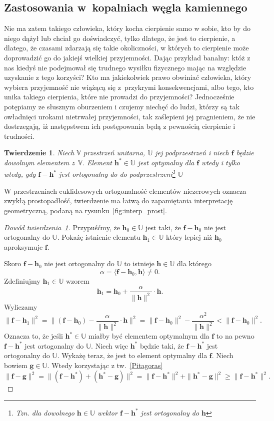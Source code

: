 \documentclass[12pt]{mwbk}
\theoremstyle{plain}
\newtheorem{twier}{Twierdzenie}[chapter] %
\theoremstyle{definition}
\theoremstyle{remark}
\newcommand{\ff}{\mathbf{f}}
\newcommand{\hh}{\mathbf{h}}
\newcommand{\gggg}{\mathbf{g}}
\newcommand{\skalar}[2]{\pmb{\langle}#1,#2\pmb{\rangle}}
\begin{document}
\subsection{Zastosowania w~kopalniach węgla kamiennego}
Nie ma zatem takiego człowieka, który kocha cierpienie samo w sobie, 
kto by do niego dążył lub chciał go doświadczyć, tylko dlatego, że
jest to cierpienie, a dlatego, że czasami zdarzają się takie 
okoliczności, w których to cierpienie może doprowadzić 
go do jakiejś wielkiej przyjemności. 
Dając przykład banalny: któż z nas kiedyś nie podejmował 
się trudnego wysiłku fizycznego mając na względzie 
uzyskanie z tego korzyści? 
Kto ma jakiekolwiek prawo obwiniać człowieka, 
który wybiera przyjemność nie wiążącą się z~przykrymi 
konsekwencjami, albo tego, kto unika takiego cierpienia, 
które nie prowadzi do przyjemności? 
Jednocześnie potępiamy ze słusznym oburzeniem i czujemy 
niechęć do ludzi, którzy są tak owładnięci urokami nietrwałej 
przyjemności, tak zaślepieni jej pragnieniem, 
że nie dostrzegają, iż następstwem ich 
postępowania będą z pewnością cierpienie i trudności.


\begin{twier}\label{podst_tw_unit}
	Niech $\mathbb{V}$ przestrzeń unitarna, $\mathbb{U}$ jej
	podprzestrzeń i niech $\ff$ będzie dowolnym elementem
	z~$\mathbb{V}$. Element $\hh^*\in\mathbb{U}$ jest optymalny
	dla $\ff$ wtedy i tylko wtedy, gdy $\ff-\hh^*$ jest ortogonalny do
	do podprzestrzeni\footnote{Tzn. dla dowolnego $\hh\in\mathbb{U}$
	wektor $\ff-\hh^*$ jest ortogonalny do $\hh$} $\mathbb{U}$
\end{twier}

W przestrzeniach euklidesowych ortogonalność elementów
niezerowych oznacza zwykłą prostopadłość, twierdzenie ma łatwą do
zapamiętania interpretację geometryczną, podaną na
rysunku~\ref{fig:interp_prost}.

\begin{proof}[Dowód twierdzenia~\ref{podst_tw_unit}]
	Przypuśćmy, że $\hh_0\in\mathbb{U}$ jest taki, że $\ff-\hh_0$ nie
	jest ortogonalny do $\mathbb{U}$. Pokażę istnienie elementu
	$\hh_1\in\mathbb{U}$ który lepiej niż $\hh_0$ aproksymuje $\ff$.
	
	Skoro $\ff-\hh_0$ nie jest ortogonalny do $\mathbb{U}$ to istnieje
	$\hh\in\mathbb{U}$ dla którego
	\[
	\alpha=\skalar{\ff-\hh_0}{\hh}\ne0.
	\]
	Zdefiniujmy $\hh_1\in\mathbb{U}$ wzorem
	\[
	\hh_1=\hh_0+\frac{\alpha}{\|\hh\|^2}\cdot \hh.
	\]
	Wyliczamy
	\[
	\|\ff-\hh_1\|^2=
	\|(\ff-\hh_0)-\frac{\alpha}{\|\hh\|^2}\cdot\hh\|^2=
	\|\ff-\hh_0\|^2-\frac{\alpha^2}{\|\hh\|^2}<\|\ff-\hh_0\|^2.
	\]
	Oznacza to, że jeśli $\hh^*\in\mathbb{U}$ miałby być elementem
	optymalnym dla $\ff$ to na pewno $\ff-\hh^*$ jest ortogonalny
	do $\mathbb{U}$. Niech więc $\hh^*$ będzie taki, że
	$\ff-\hh^*$ jest ortogonalny do $\mathbb{U}$. Wykażę teraz, że
	jest to element optymalny dla $\ff$. Niech bowiem
	$\gggg\in\mathbb{U}$. Wtedy korzystając z tw.~\ref{Pitagoras}
	\[
	\|\ff-\gggg\|^2=\|(\ff-\hh^*)+(\hh^*-\gggg)\|^2=
	\|\ff-\hh^*\|^2+\|\hh^*-\gggg\|^2\geq
	\|\ff-\hh^*\|^2.
\]
\end{proof}
\end{document}
